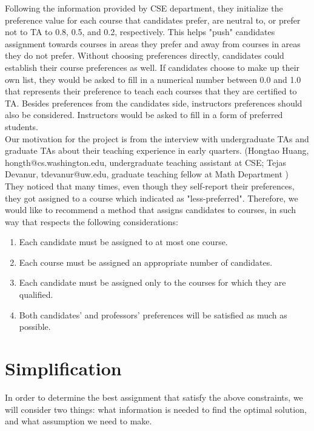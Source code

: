 \documentclass[twoside,twocolumn]{article}
\begin{document}
    \indent Following the information provided by CSE department, they initialize the preference value for each course that candidates prefer, 
    are neutral to, or prefer not to TA to 0.8, 0.5, and 0.2, respectively. This helps "push" candidates assignment towards courses 
    in areas they prefer and away from courses in areas they do not prefer. Without choosing preferences directly, candidates could establish
    their course preferences as well. If candidates choose to make up their own list, they would be asked to fill in a numerical number 
    between 0.0 and 1.0 that represents their preference to teach each courses that they are certified to TA. Besides preferences from 
    the candidates side, instructors preferences should also be considered. Instructors would be asked to fill in a form of preferred students.
    \\ \indent Our motivation for the project is from the interview with undergraduate TAs and graduate TAs about their teaching experience in early quarters.
    (Hongtao Huang, hongth@cs.washington.edu, undergraduate teaching assistant at CSE; Tejas Devanur, tdevanur@uw.edu, graduate teaching fellow at Math Department
    ) They noticed that many times, even though they self-report their preferences, they got assigned to a course which 
    indicated as "less-preferred". Therefore, we would like to recommend a method that assigns candidates to
    courses, in such way that respects the following considerations:
    \begin{enumerate}
        \item Each candidate must be assigned to at most one course.
        \item Each course must be assigned an appropriate number of candidates.
        \item Each candidate must be assigned only to the courses for which they are qualified.
        \item Both candidates' and professors' preferences will be satisfied as much as possible.
    \end{enumerate}
    \section{Simplification}
    In order to determine the best assignment that satisfy the above constraints, we will consider two things: what information is needed to
    find the optimal solution, and what assumption we need to make.
\end{document}
